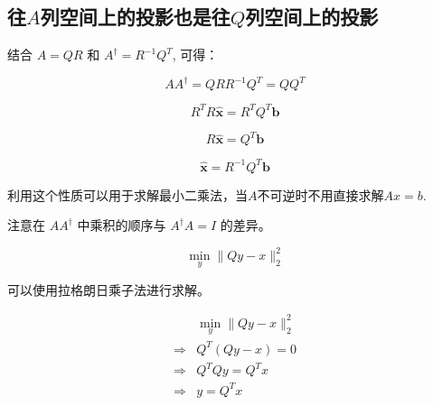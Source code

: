 \subsection{往$A$列空间上的投影也是往$Q$列空间上的投影}

结合 $A=Q R$ 和 $A^{\dagger}=R^{-1} Q^{T}$, 可得：

\begin{theorem}
    \begin{equation}
A A^{\dagger}=Q R R^{-1} Q^{T}=Q Q^{T}
\end{equation}
\end{theorem}

\begin{theorem}
    \begin{equation}R^{ {T}} R \widehat{\boldsymbol{x}}=R^{ {T}} Q^{ {T}} \boldsymbol{b}\end{equation}

    \begin{equation}R \widehat{\boldsymbol{x}}=Q^{ {T}} \boldsymbol{b}\end{equation}

    \begin{equation}\widehat{\boldsymbol{x}}=R^{-1} Q^{ {T}} \boldsymbol{b}\end{equation}
\end{theorem}

利用这个性质可以用于求解最小二乘法，当$A$不可逆时不用直接求解$Ax=b$.

\begin{remark}
    注意在 $A A^{\dagger}$ 中乘积的顺序与 $A^{\dagger} A=I$ 的差异。
\end{remark}

\begin{problem}[投影问题]
    \begin{equation}\min _{y}\|Q y-x\|_{2}^{2}\end{equation}
\end{problem}

可以使用拉格朗日乘子法进行求解。

\begin{equation}
\begin{aligned}
&\min _{y}\|Q y-x\|_{2}^{2}\\
 \Rightarrow& Q^{T}(Q y-x)=0 \\
\Rightarrow& Q^{T} Q y=Q^{T} x\\ 
\Rightarrow & y=Q^{T} x
\end{aligned}
\end{equation}

